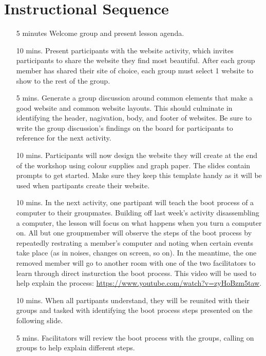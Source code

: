 \documentclass[11pt]{article}
\begin{document}
  \section*{Instructional Sequence}
  \begin{itemize}
    \item[5 minutes] Welcome group and present lesson agenda.
    \item[10 mins.] Present participants with the website activity, which
      invites participants to share the website they find most beautiful. After
      each group member has shared their site of choice, each group must select
      1 website to show to the rest of the group. 
    \item[5 mins.] Generate a group discussion
      around common elements that make a good website and common website
      layouts. This should culminate in identifying the header, nagivation,
      body, and footer of websites. Be sure to write the group discussion's
      findings on
      the board for participants to reference for the next activity.
    \item[10 mins.] Participants will now design the website they will create at
      the end of the workshop using colour supplies and graph paper. The slides
      contain
      prompts to get started. Make sure they
      keep this template handy as it will be used when partipants create their
      website.
    \item[10 mins.] In the next activity, one partipant will teach the boot
      process of a computer to
      their groupmates. Building off last week's activity disassembling a
      computer, the lesson will focus on what happens when you turn a computer on.
      All but one groupmember will observe the steps of
      the boot process by repeatedly restrating a member's computer and noting
      when certain events take place (as in noises, changes on screen, so on). In the
      meantime, the one removed member will go to another room with one of the
      two facilitators to learn through direct insturction the boot process.
      This video will be used to help explain the process: \url{https://www.youtube.com/watch?v=zyHoBzm5taw}.
    \item[10 mins.] When all partipants understand, they will be reunited with
      their groups and tasked with identifying the boot process steps presented
      on the following slide.
    \item[5 mins.] Facilitators will review the boot process with the groups,
      calling on groups to help explain different steps.

\end{itemize}
\end{document}
